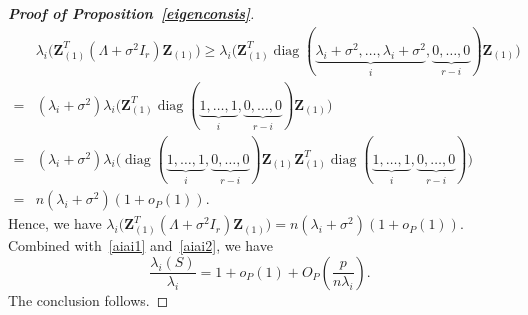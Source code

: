 \documentclass[review]{elsarticle}
\DeclareMathOperator{\mydiag}{diag}
\newcommand{\bZ}{\mathbf{Z}}
\theoremstyle{plain}
\theoremstyle{definition}
\theoremstyle{remark}
\begin{document}
\begin{proof}[\textbf{Proof of Proposition~\ref{eigenconsis}}]
$$\begin{aligned}
        &\lambda_i\big(\bZ_{(1)}^T(\Lambda+\sigma^2 I_r)\bZ_{(1)}\big)
        \geq
    \lambda_{i}\big(\bZ_{(1)}^T \mydiag(\underbrace{\lambda_i+\sigma^2,\ldots,\lambda_i+\sigma^2}_{i},\underbrace{0,\ldots,0}_{r-i})\bZ_{(1)}\big)\\
        =&
        (\lambda_i+\sigma^2)\lambda_{i}\big(\bZ_{(1)}^T\mydiag(\underbrace{1,\ldots,1}_{i},\underbrace{0,\ldots,0}_{r-i})\bZ_{(1)}\big)\\
        =&
        (\lambda_i+\sigma^2)\lambda_{i}\big( \mydiag(\underbrace{1,\ldots,1}_{i},\underbrace{0,\ldots,0}_{r-i})\bZ_{(1)}\bZ_{(1)}^T \mydiag(\underbrace{1,\ldots,1}_{i},\underbrace{0,\ldots,0}_{r-i})\big)\\
        =&n(\lambda_i+\sigma^2)(1+o_P(1)).
    \end{aligned}
    $$
    Hence, we have
        $
        \lambda_i\big(\bZ_{(1)}^T(\Lambda+\sigma^2 I_r)\bZ_{(1)}\big)=n(\lambda_i+\sigma^2)(1+o_P(1))
        $. Combined with~\eqref{aiai1} and~\eqref{aiai2}, we have
        $$
        \frac{\lambda_i(S)}{\lambda_i}=1+o_P(1)+O_P(\frac{p}{n\lambda_i}).
        $$
        The conclusion follows.

\end{proof}
\end{document}
